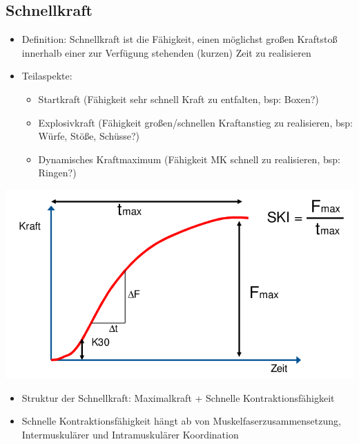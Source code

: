 \subsection{Schnellkraft}

\begin{minipage}{0.5\textwidth}
\begin{itemize}
    \item Definition: Schnellkraft ist die Fähigkeit, einen möglichst großen Kraftstoß innerhalb einer zur Verfügung stehenden (kurzen) Zeit zu realisieren
    \item Teilaspekte:
    \begin{itemize}
        \item Startkraft (Fähigkeit sehr schnell Kraft zu entfalten, bsp: Boxen?)
        \item Explosivkraft (Fähigkeit großen/schnellen Kraftanstieg zu realisieren, bsp: Würfe, Stöße, Schüsse?)
        \item Dynamisches Kraftmaximum (Fähigkeit MK schnell zu realisieren, bsp: Ringen?)
    \end{itemize}
\end{itemize}
\end{minipage}
\begin{minipage}{0.5\textwidth}
\includegraphics[width=\textwidth]{pictures/kraftanstiegskurve}
\end{minipage}
\begin{itemize}
    \item Struktur der Schnellkraft: Maximalkraft + Schnelle Kontraktionsfähigkeit
    \item Schnelle Kontraktionsfähigkeit hängt ab von Muskelfaserzusammensetzung, Intermuskulärer und Intramuskulärer Koordination
\end{itemize}

